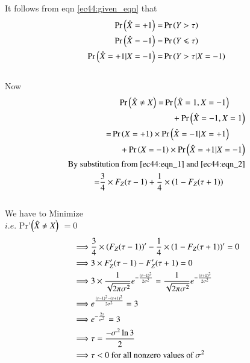 It follows from eqn \eqref{ec44:given_eqn} that
\begin{align}
    \Pr\left(\hat{X}=+1\right)=&\Pr\left(Y>\tau\right)
    \\\Pr\left(\hat X =-1\right)=&\Pr\left(Y\leqslant\tau\right)
    \\ \Pr\left(\hat X =+1|X=-1\right)=&\Pr\left(Y>\tau|X=-1\right)
\end{align}
\\Now
\begin{align}
    \begin{split}
        \Pr\left(\hat X \neq X\right) =& \Pr\left(\hat X = 1,X=-1\right)
        \\ & \quad +  \Pr\left(\hat X = -1,X=1\right)
    \end{split}
        \\
    \begin{split}
         =&\Pr\left(X =+1\right)\times\Pr\left(\hat X=-1|X=+1\right) 
         \\&\quad+\Pr\left(X =-1\right)\times\Pr\left(\hat X=+1|X=-1\right)
    \end{split}
    \\
    \begin{split}
        \text{By substi}&\text{tution from \eqref{ec44:eqn_1} and \eqref{ec44:eqn_2}}
        \\=&\frac{3}{4} \times F_Z(\tau -1) + \frac{1}{4} \times \left(1-F_Z(\tau+1)\right)
    \end{split}
\end{align}
\\[2em]We have to Minimize 
\\$i.e.$ \;\; Pr'$\left(\hat X \neq X\right)$ $=0$
\begin{align}
    \implies & \frac{3}{4} \times \left(F_Z(\tau-1)\right)' - \frac{1}{4} \times \left(1-F_Z(\tau+1)\right)'=0
    \\ \implies & 3\times F'_Z(\tau-1) - F'_Z(\tau+1)=0
    \\\implies & 3\times\frac{1}{\sqrt{2\pi\sigma^2}}e^{-\frac{\left(\tau-1\right)^2}{2\sigma^2}}=\frac{1}{\sqrt{2\pi\sigma^2}}e^{-\frac{\left(\tau+1\right)^2}{2\sigma^2}}
    \\\implies & e^{\frac{\left(\tau-1\right)^2-\left(\tau +1\right)^2}{2\sigma^2}}=3 
    \\ \implies & e^{-\frac{2\tau}{\sigma^2}}=3
    \\ \implies & \tau = \frac{-\sigma^2\ln{3}}{2}
    \\ \implies & \tau < 0 \text{  for all nonzero values of $\sigma^2$}
\end{align}
